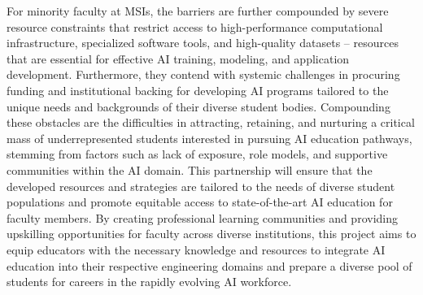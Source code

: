 \documentclass[11pt]{article}
\begin{document}
For minority faculty at MSIs, the barriers are further compounded by severe resource constraints that restrict access to high-performance computational infrastructure, specialized software tools, and high-quality datasets – resources that are essential for effective AI training, modeling, and application development. Furthermore, they contend with systemic challenges in procuring funding and institutional backing for developing AI programs tailored to the unique needs and backgrounds of their diverse student bodies. Compounding these obstacles are the difficulties in attracting, retaining, and nurturing a critical mass of underrepresented students interested in pursuing AI education pathways, stemming from factors such as lack of exposure, role models, and supportive communities within the AI domain. This partnership will ensure that the developed resources and strategies are tailored to the needs of diverse student populations and promote equitable access to state-of-the-art AI education for faculty members.  By creating professional learning communities and providing upskilling opportunities for faculty across diverse institutions, this project aims to equip educators with the necessary knowledge and resources to integrate AI education into their respective engineering domains and prepare a diverse pool of students for careers in the rapidly evolving AI workforce. 
\end{document}
